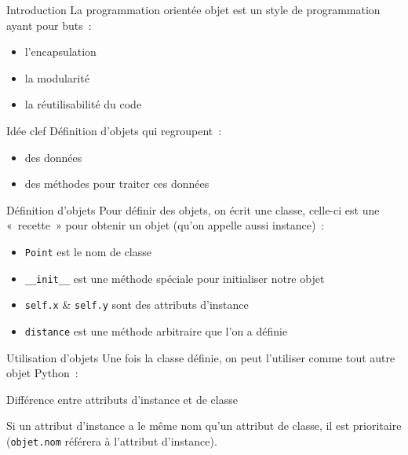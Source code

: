 \begin{frame}{Introduction}
  La programmation orientée objet est un style de programmation ayant pour buts~:

  \begin{itemize}
    \item l'encapsulation
    \item la modularité
    \item la réutilisabilité du code
  \end{itemize}
\end{frame}

\begin{frame}{Idée clef}
  Définition d'\alert{objets} qui regroupent~:

  \begin{itemize}
    \item des données
    \item des méthodes pour traiter ces données
  \end{itemize}
\end{frame}

\begin{frame}{Définition d'objets}
  Pour définir des objets, on écrit une classe, celle-ci est une «~recette~» pour obtenir un objet (qu'on appelle aussi instance)~:


  \begin{itemize}
    \item \texttt{Point} est le nom de classe
    \item \texttt{\_\_init\_\_} est une méthode spéciale pour initialiser notre objet
    \item \texttt{self.x} \& \texttt{self.y} sont des attributs d'instance
    \item \texttt{distance} est une méthode arbitraire que l'on a définie
  \end{itemize}
\end{frame}

\begin{frame}{Utilisation d'objets}
  Une fois la classe définie, on peut l'utiliser comme tout autre objet Python~:

\end{frame}

\begin{frame}{Différence entre attributs d'instance et de classe}

  Si un attribut d'instance a le même nom qu'un attribut de classe, il est prioritaire (\texttt{objet.nom} référera à l'attribut d'instance).
\end{frame}

